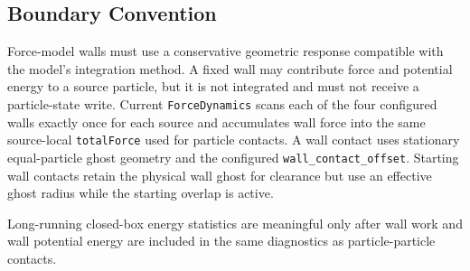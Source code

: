 \subsection{Boundary Convention}

Force-model walls must use a conservative geometric response compatible with
the model's integration method.  A fixed wall may contribute force and
potential energy to a source particle, but it is not integrated and must not
receive a particle-state write.  Current \texttt{ForceDynamics} scans each of
the four configured walls exactly once for each source and accumulates wall
force into the same source-local \texttt{totalForce} used for particle
contacts.  A wall contact uses stationary equal-particle ghost geometry and
the configured \texttt{wall\_contact\_offset}.  Starting wall contacts retain
the physical wall ghost for clearance but use an effective ghost radius while
the starting overlap is active.

Long-running closed-box energy statistics are meaningful only after wall work
and wall potential energy are included in the same diagnostics as
particle-particle contacts.
